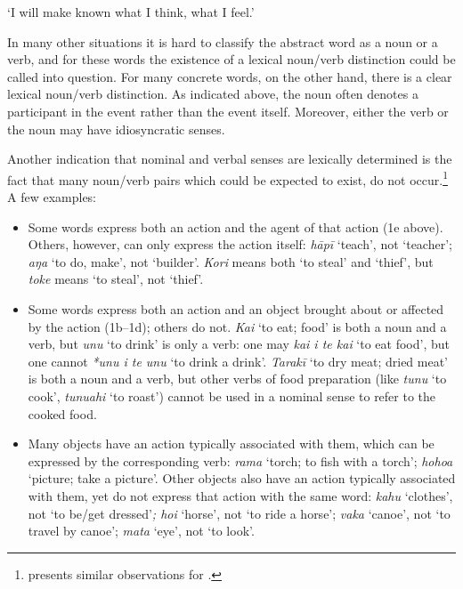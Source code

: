 \glt
‘I will make known what I think, what I feel.’ \textstyleExampleref{[R443.013–015]}
\z

In many other situations it is hard to classify the abstract word as a noun or a verb, and for these words the existence of a lexical noun/verb distinction could be called into question. For many concrete words, on the other hand, there is a clear lexical noun/verb distinction. As indicated above, the noun often denotes a participant in the event rather than the event itself. Moreover, either the verb or the noun may have idiosyncratic senses.

\largerpage
Another indication that nominal and verbal senses are lexically determined is the fact that many noun/verb pairs which could be expected to exist, do not occur.\footnote{\label{fn:102}\citet{Clark1983Maori} presents similar observations for .} A few examples:

\begin{itemize}
\item 
Some words express both an action and the agent of that action (1e above). Others, however, can only express the action itself: \textit{hāpī} ‘teach’, not ‘teacher’; \textit{aŋa} ‘to do, make’, not ‘builder’. \textit{Kori} means both ‘to steal’ and ‘thief’, but \textit{toke} means ‘to steal’, not ‘thief’.

\item 
Some words express both an action and an object brought about or affected by the action (1b–1d); others do not. \textit{Kai} ‘to eat; food’ is both a noun and a verb, but \textit{unu} ‘to drink’ is only a verb: one may \textit{kai i te kai} ‘to eat food’, but one cannot \textit{*unu i te unu} ‘to drink a drink’. \textit{Tarakī} ‘to dry meat; dried meat’ is both a noun and a verb, but other verbs of food preparation (like \textit{tunu} ‘to cook’, \textit{tunuahi} ‘to roast’) cannot be used in a nominal sense to refer to the cooked food.

\item 
Many objects have an action typically associated with them, which can be expressed by the corresponding verb: \textit{rama} ‘torch; to fish with a torch’; \textit{hoho{\ꞌ}a} ‘picture; take a picture’. Other objects also have an action typically associated with them, yet do not express that action with the same word: \textit{kahu} ‘clothes’, not ‘to be/get dressed’\textit{; hoi} ‘horse’, not ‘to ride a horse’; \textit{vaka} ‘canoe’, not ‘to travel by canoe’; \textit{mata} ‘eye’, not ‘to look’.

\end{itemize}

